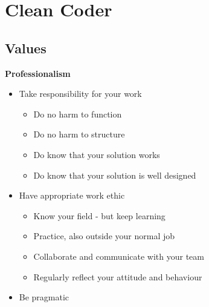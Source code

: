 
\section{Clean Coder}
\subsection{Values}
\textbf{Professionalism}
\begin{itemize}
    \item Take responsibility for your work
    \begin{itemize}
        \item Do no harm to function
        \item Do no harm to structure
        \item Do know that your solution works
        \item Do know that your solution is well designed
    \end{itemize}
    \item Have appropriate work ethic
    \begin{itemize}
        \item Know your field - but keep learning
        \item Practice, also outside your normal job
        \item Collaborate and communicate with your team
        \item Regularly reflect your attitude and behaviour
    \end{itemize}
    \item Be pragmatic
\end{itemize}

